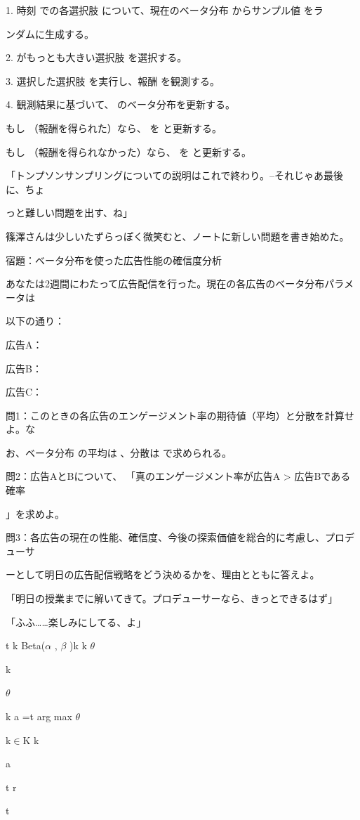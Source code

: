 1. 時刻 での各選択肢 について、現在のベータ分布 からサンプル値 をラ\par
ンダムに⽣成する。\par
2. がもっとも⼤きい選択肢 を選択する。\par
3. 選択した選択肢 を実⾏し、報酬 を観測する。\par
4. 観測結果に基づいて、 のベータ分布を更新する。\par
もし （報酬を得られた）なら、 を と更新する。\par
もし （報酬を得られなかった）なら、 を と更新する。\par
「トンプソンサンプリングについての説明はこれで終わり。--それじゃあ最後に、ちょ\par
っと難しい問題を出す、ね」\par
篠澤さんは少しいたずらっぽく微笑むと、ノートに新しい問題を書き始めた。\par
宿題：ベータ分布を使った広告性能の確信度分析\par
あなたは2週間にわたって広告配信を⾏った。現在の各広告のベータ分布パラメータは\par
以下の通り：\par
広告A：\par
広告B：\par
広告C：\par
問1：このときの各広告のエンゲージメント率の期待値（平均）と分散を計算せよ。な\par
お、ベータ分布 の平均は 、分散は で求められる。\par
問2：広告AとBについて、 「真のエンゲージメント率が広告A > 広告Bである確率\par
」を求めよ。\par
問3：各広告の現在の性能、確信度、今後の探索価値を総合的に考慮し、プロデューサ\par
ーとして明⽇の広告配信戦略をどう決めるかを、理由とともに答えよ。\par
「明⽇の授業までに解いてきて。プロデューサーなら、きっとできるはず」\par
「ふふ……楽しみにしてる、よ」\par
t k Beta($\alpha$  , $\beta$  )k k $\theta$\par
k\par
$\theta$\par
k a  =t arg max  $\theta$\par
k$\in$K k\par
a\par
t r\par
t\par
